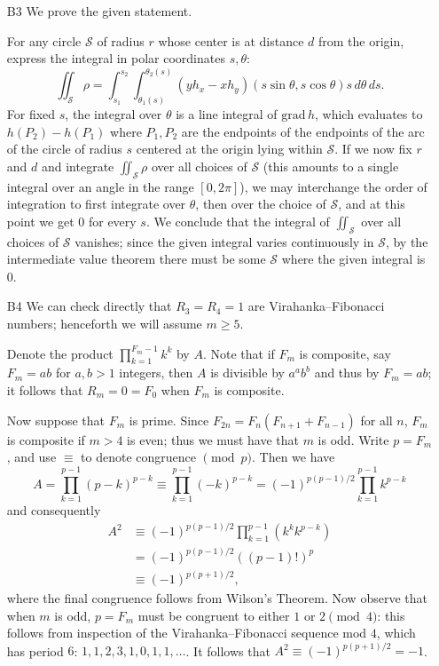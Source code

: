 \documentclass[amssymb,twocolumn,pra,10pt,aps]{revtex4-1}
\begin{document}
\begin{itemize}
\item[B3]
We prove the given statement.

For any circle $\mathcal{S}$ of radius $r$ whose center is at distance $d$ from the origin, express the integral in polar coordinates $s,\theta$:
\[
\iint_{\mathcal{S}} \rho = \int_{s_1}^{s_2} \int_{\theta_1(s)}^{\theta_2(s)} (yh_x - xh_y)(s \sin \theta, s \cos \theta) s\,d\theta\,ds.
\]
For fixed $s$, the integral over $\theta$ is a line integral of $\mathrm{grad} \, h$, which evaluates to $h(P_2) - h(P_1)$
where $P_1, P_2$ are the endpoints of the endpoints of the arc of the circle of radius $s$ centered at the origin lying within $\mathcal{S}$. If we now fix $r$ and $d$ and integrate $\iint_{\mathcal{S}} \rho$ over all choices of $\mathcal{S}$ (this amounts to a single integral over an angle in the range $[0, 2\pi]$), we may interchange the order of integration to first integrate over $\theta$,
then over the choice of $\mathcal{S}$, and at this point we get 0 for every $s$.
We conclude that the integral of $\iint_{\mathcal{S}}$ over all choices of $\mathcal{S}$ vanishes; since the given integral varies continuously in $\mathcal{S}$, by the intermediate value theorem there must be some $\mathcal{S}$  where the given integral is 0.

\item[B4]
We can check directly that $R_3=R_4=1$ are Virahanka--Fibonacci numbers; henceforth we will assume $m \geq 5$.

Denote the product $\prod_{k=1}^{F_m-1} k^k$ by $A$. Note that if $F_m$ is composite, say $F_m = ab$ for $a,b>1$ integers, then $A$ is divisible by $a^a b^b$ and thus by $F_m=ab$; it follows that $R_m=0=F_0$ when $F_m$ is composite.

Now suppose that $F_m$ is prime. Since $F_{2n} = F_n(F_{n+1}+F_{n-1})$ for all $n$, $F_m$ is composite if $m>4$ is even; thus we must have that $m$ is odd. Write $p=F_m$, and use $\equiv$ to denote congruence $\pmod p$. Then we have
\[
A = \prod_{k=1}^{p-1} (p-k)^{p-k} \equiv \prod_{k=1}^{p-1} (-k)^{p-k} = (-1)^{p(p-1)/2} \prod_{k=1}^{p-1} k^{p-k}
\]
and consequently
\begin{align*}
A^2 &\equiv (-1)^{p(p-1)/2} \prod_{k=1}^{p-1} (k^k k^{p-k}) \\
&= (-1)^{p(p-1)/2}((p-1)!)^p \\
&\equiv (-1)^{p(p+1)/2},
\end{align*}
where the final congruence follows from Wilson's Theorem. Now observe that when $m$ is odd, $p=F_m$ must be congruent to either $1$ or $2 \pmod{4}$: this follows from inspection of the Virahanka--Fibonacci sequence mod $4$, which has period $6$: $1,1,2,3,1,0,1,1,\ldots$. It follows that $A^2 \equiv (-1)^{p(p+1)/2} = -1$.


\end{itemize}
\end{document}
